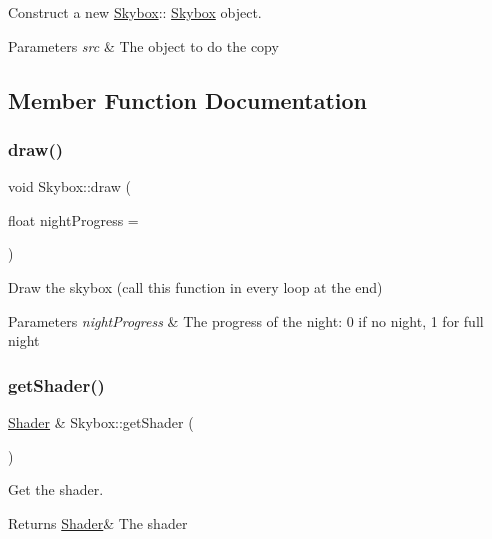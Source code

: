 Construct a new \hyperlink{class_skybox}{Skybox}\+:\+: \hyperlink{class_skybox}{Skybox} object. 


\begin{DoxyParams}{Parameters}
{\em src} & The object to do the copy \\
\hline
\end{DoxyParams}


\subsection{Member Function Documentation}
\mbox{\label{class_skybox_a103d5448a82178e8abaa0ab5fad2c07f}} 
\subsubsection{\texorpdfstring{draw()}{draw()}}
{\footnotesize\ttfamily void Skybox\+::draw (\begin{DoxyParamCaption}\item[{float}]{night\+Progress = {} }\end{DoxyParamCaption})}



Draw the skybox (call this function in every loop at the end) 


\begin{DoxyParams}{Parameters}
{\em night\+Progress} & The progress of the night\+: 0 if no night, 1 for full night \\
\hline
\end{DoxyParams}
\mbox{\label{class_skybox_aeeb4151675a4021c3fdfca1e31d33a76}} 
\subsubsection{\texorpdfstring{get\+Shader()}{getShader()}\hspace{0.1cm}{\footnotesize\ttfamily [1/2]}}
{\footnotesize\ttfamily \hyperlink{class_shader}{Shader} \& Skybox\+::get\+Shader (\begin{DoxyParamCaption}{ }\end{DoxyParamCaption})}



Get the shader. 

\begin{DoxyReturn}{Returns}
\hyperlink{class_shader}{Shader}\& The shader 
\end{DoxyReturn}
\mbox{\label{class_skybox_a1df309652975013036b534a9e9e11bc2}} 
